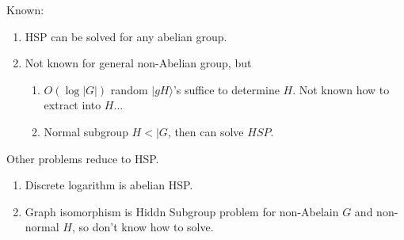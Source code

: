 Known:

\begin{enumerate}
\item HSP can be solved for any abelian group.
\item Not known for general non-Abelian group, but
  \begin{enumerate}
  \item $O(\log |G|)$ random $| gH \rangle$'s suffice to determine
    $H$.  Not known how to extract into $H$...
  \item Normal subgroup $H <| G$, then can solve $HSP$.
  \end{enumerate}
\end{enumerate}

Other problems reduce to HSP.

\begin{enumerate}
\item Discrete logarithm is abelian HSP.
\item Graph isomorphism is Hiddn Subgroup problem for non-Abelain $G$
  and non-normal $H$, so don't know how to solve.
\end{enumerate}


